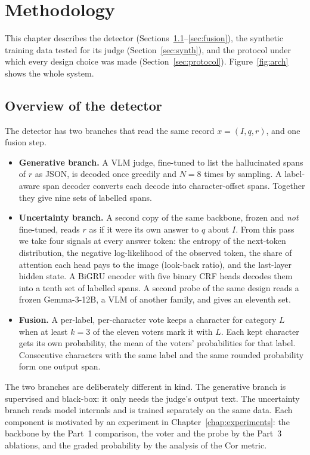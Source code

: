 \chapter{Methodology}\label{chap:methods}

This chapter describes the detector (Sections~\ref{sec:overview}--\ref{sec:fusion}), the synthetic training data tested for its judge (Section~\ref{sec:synth}), and the protocol under which every design choice was made (Section~\ref{sec:protocol}). Figure~\ref{fig:arch} shows the whole system.

\section{Overview of the detector}\label{sec:overview}

The detector has two branches that read the same record $x = (I, q, r)$, and one fusion step.

\begin{itemize}
    \item \textbf{Generative branch.} A VLM judge, fine-tuned to list the hallucinated spans of $r$ as JSON, is decoded once greedily and $N = 8$ times by sampling. A label-aware span decoder converts each decode into character-offset spans. Together they give nine sets of labelled spans.
    \item \textbf{Uncertainty branch.} A second copy of the same backbone, frozen and \emph{not} fine-tuned, reads $r$ as if it were its own answer to $q$ about $I$. From this pass we take four signals at every answer token: the entropy of the next-token distribution, the negative log-likelihood of the observed token, the share of attention each head pays to the image (look-back ratio), and the last-layer hidden state. A BiGRU encoder with five binary CRF heads decodes them into a tenth set of labelled spans. A second probe of the same design reads a frozen Gemma-3-12B, a VLM of another family, and gives an eleventh set.
    \item \textbf{Fusion.} A per-label, per-character vote keeps a character for category $L$ when at least $k = 3$ of the eleven voters mark it with $L$. Each kept character gets its own probability, the mean of the voters' probabilities for that label. Consecutive characters with the same label and the same rounded probability form one output span.
\end{itemize}

The two branches are deliberately different in kind. The generative branch is supervised and black-box: it only needs the judge's output text. The uncertainty branch reads model internals and is trained separately on the same data. Each component is motivated by an experiment in Chapter~\ref{chap:experiments}: the backbone by the Part~1 comparison, the voter and the probe by the Part~3 ablations, and the graded probability by the analysis of the Cor metric.

